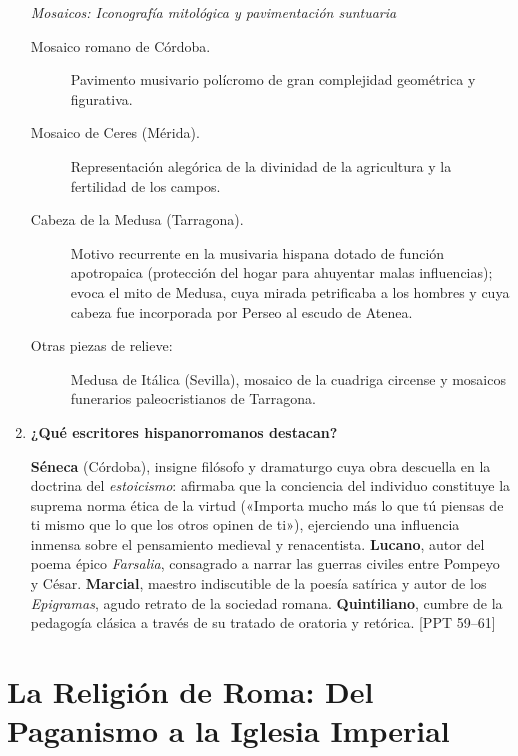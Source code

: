 \documentclass[11pt,letterpaper]{article}
\newcommand{\fuente}[1]{\nolinebreak\hfill{\footnotesize\color{black!55}\textsc{[#1]}}}
\newcommand{\preg}[1]{\item \textbf{#1}\par\nopagebreak\vspace{0.2em}}
\begin{document}
\begin{enumerate}[resume]
  \textit{Mosaicos: Iconografía mitológica y pavimentación suntuaria}
  \begin{description}
    \item[Mosaico romano de Córdoba.] Pavimento musivario polícromo de gran complejidad geométrica y figurativa.
    \item[Mosaico de Ceres (Mérida).] Representación alegórica de la divinidad de la agricultura y la fertilidad de los campos.
    \item[Cabeza de la Medusa (Tarragona).] Motivo recurrente en la musivaria hispana dotado de función apotropaica (protección del hogar para ahuyentar malas influencias); evoca el mito de Medusa, cuya mirada petrificaba a los hombres y cuya cabeza fue incorporada por Perseo al escudo de Atenea.
    \item[Otras piezas de relieve:] Medusa de Itálica (Sevilla), mosaico de la cuadriga circense y mosaicos funerarios paleocristianos de Tarragona.
  \end{description}

  \preg{¿Qué escritores hispanorromanos destacan?}
  \textbf{Séneca} (Córdoba), insigne filósofo y dramaturgo cuya obra descuella en la doctrina del \emph{estoicismo}: afirmaba que la conciencia del individuo constituye la suprema norma ética de la virtud («Importa mucho más lo que tú piensas de ti mismo que lo que los otros opinen de ti»), ejerciendo una influencia inmensa sobre el pensamiento medieval y renacentista. \textbf{Lucano}, autor del poema épico \emph{Farsalia}, consagrado a narrar las guerras civiles entre Pompeyo y César. \textbf{Marcial}, maestro indiscutible de la poesía satírica y autor de los \emph{Epigramas}, agudo retrato de la sociedad romana. \textbf{Quintiliano}, cumbre de la pedagogía clásica a través de su tratado de oratoria y retórica. \fuente{PPT 59--61}
\end{enumerate}

\section{La Religión de Roma: Del Paganismo a la Iglesia Imperial}
\end{document}

